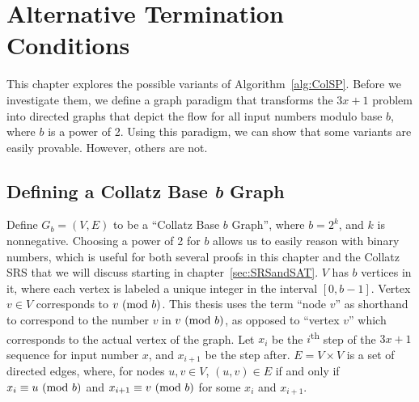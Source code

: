 \chapter{Alternative Termination Conditions} \label{sec:alttercdns}
 This chapter explores the possible variants of Algorithm~\ref{alg:ColSP}. Before we investigate them, we define a graph paradigm that transforms the $3x+1$ problem into directed graphs that depict the flow for all input numbers modulo base $b$, where $b$ is a power of 2. Using this paradigm, we can show that some variants are easily provable. However, others are not.
\section{Defining a Collatz Base \textit{b} Graph} \label{subsec:colgraph}
Define $G_b=(V,E)$ to be a ``Collatz Base $b$ Graph'', where $b = 2^k$, and $k$ is nonnegative. Choosing a power of 2 for $b$ allows us to easily reason with binary numbers, which is useful for both several proofs in this chapter and the Collatz SRS that we will discuss starting in chapter~\ref{sec:SRSandSAT}. $V$ has $b$ vertices in it, where each vertex is labeled a unique integer in the interval $[0, b-1]$. Vertex $v \in V$ corresponds to $v \ (\mathrm{mod}\ b)$. This thesis uses the term ``node $v$'' as shorthand to correspond to the number $v$ in $v \ (\mathrm{mod}\ b)$, as opposed to ``vertex $v$'' which corresponds to the actual vertex of the graph. Let $x_i$ be the $i$\textsuperscript{th} step of the $3x+1$ sequence for input number $x$, and $x_{i+1}$ be the step after. $E = V \times V$ is a set of directed edges, where, for nodes $u, v \in V$, $(u,v) \in E$ if and only if $x_i \equiv u \ (\mathrm{mod}\ b)$ and $x_{i+1} \equiv v \ (\mathrm{mod}\ b)$ for some $x_i$ and $x_{i+1}$. \par

